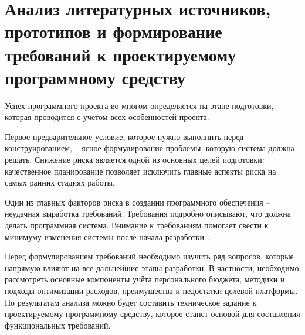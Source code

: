 \section{Анализ литературных источников, прототипов и формирование требований к проектируемому программному средству}
\label{sec:analysis}

Успех программного проекта во многом определяется на этапе подготовки, которая проводится с учетом всех особенностей проекта.

Первое предварительное условие, которое нужно выполнить перед конструированием, -- ясное формулирование проблемы, которую система должна решать.
Снижение риска является одной из основных целей подготовки: качественное планирование позволяет исключить главные аспекты риска на самых ранних стадиях работы.

Один из главных факторов риска в создании программного обеспечения -- не\-удач\-ная выработка требований.
Требования подробно описывают, что должна делать программная система.
Внимание к требованиям помогает свести к минимуму изменения системы после начала разработки~\cite{code_complete}.

Перед формулированием требований необходимо изучить ряд вопросов, которые напрямую влияют на все дальнейшие этапы разработки.
В частности, необходимо рассмотреть основные компоненты учёта персонального бюджета, методики и подходы оптимизации расходов, преимущества и недостатки целевой платформы.
По результатам анализа можно будет составить техническое задание к проектируемому программному средству, которое станет основой для составления функциональных требований.






